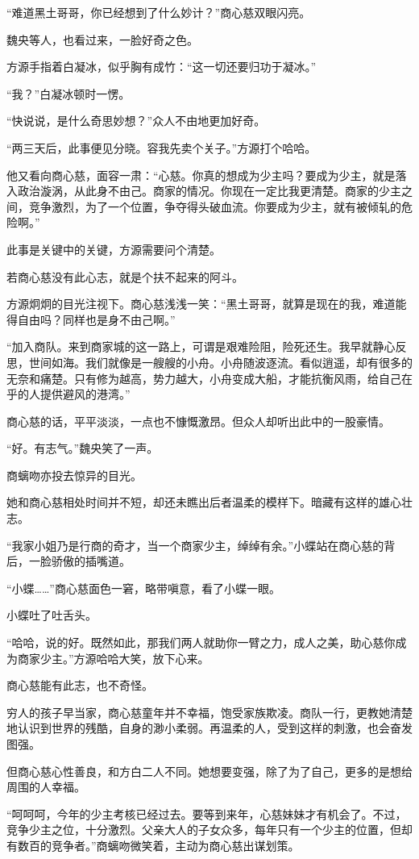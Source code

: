 \begin{this_body}
“难道黑土哥哥，你已经想到了什么妙计？”商心慈双眼闪亮。

魏央等人，也看过来，一脸好奇之色。

方源手指着白凝冰，似乎胸有成竹：“这一切还要归功于凝冰。”

“我？”白凝冰顿时一愣。

“快说说，是什么奇思妙想？”众人不由地更加好奇。

“两三天后，此事便见分晓。容我先卖个关子。”方源打个哈哈。

他又看向商心慈，面容一肃：“心慈。你真的想成为少主吗？要成为少主，就是落入政治漩涡，从此身不由己。商家的情况。你现在一定比我更清楚。商家的少主之间，竞争激烈，为了一个位置，争夺得头破血流。你要成为少主，就有被倾轧的危险啊。”

此事是关键中的关键，方源需要问个清楚。

若商心慈没有此心志，就是个扶不起来的阿斗。

方源炯炯的目光注视下。商心慈浅浅一笑：“黑土哥哥，就算是现在的我，难道能得自由吗？同样也是身不由己啊。”

“加入商队。来到商家城的这一路上，可谓是艰难险阻，险死还生。我早就静心反思，世间如海。我们就像是一艘艘的小舟。小舟随波逐流。看似逍遥，却有很多的无奈和痛楚。只有修为越高，势力越大，小舟变成大船，才能抗衡风雨，给自己在乎的人提供避风的港湾。”

商心慈的话，平平淡淡，一点也不慷慨激昂。但众人却听出此中的一股豪情。

“好。有志气。”魏央笑了一声。

商螭吻亦投去惊异的目光。

她和商心慈相处时间并不短，却还未瞧出后者温柔的模样下。暗藏有这样的雄心壮志。

“我家小姐乃是行商的奇才，当一个商家少主，绰绰有余。”小蝶站在商心慈的背后，一脸骄傲的插嘴道。

“小蝶……”商心慈面色一窘，略带嗔意，看了小蝶一眼。

小蝶吐了吐舌头。

“哈哈，说的好。既然如此，那我们两人就助你一臂之力，成人之美，助心慈你成为商家少主。”方源哈哈大笑，放下心来。

商心慈能有此志，也不奇怪。

穷人的孩子早当家，商心慈童年并不幸福，饱受家族欺凌。商队一行，更教她清楚地认识到世界的残酷，自身的渺小柔弱。再温柔的人，受到这样的刺激，也会奋发图强。

但商心慈心性善良，和方白二人不同。她想要变强，除了为了自己，更多的是想给周围的人幸福。

“呵呵呵，今年的少主考核已经过去。要等到来年，心慈妹妹才有机会了。不过，竞争少主之位，十分激烈。父亲大人的子女众多，每年只有一个少主的位置，但却有数百的竞争者。”商螭吻微笑着，主动为商心慈出谋划策。


\end{this_body}
